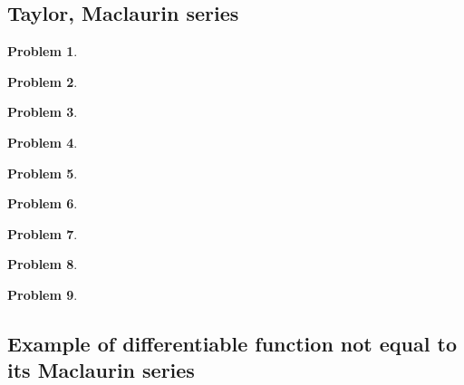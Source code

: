 \documentclass{article}
\newtheorem{problem}{Problem}
\begin{document}
\subsection{Taylor, Maclaurin series}
\begin{problem}

\end{problem}
\begin{problem}

\end{problem}
\begin{problem}

\end{problem}
\begin{problem}

\end{problem}

\begin{problem}

\end{problem}

\begin{problem}

\end{problem}


\begin{problem}

\end{problem}


\begin{problem}

\end{problem}


\begin{problem}

\end{problem}
\subsection{Example of differentiable function not equal to its Maclaurin series}
\end{document}

